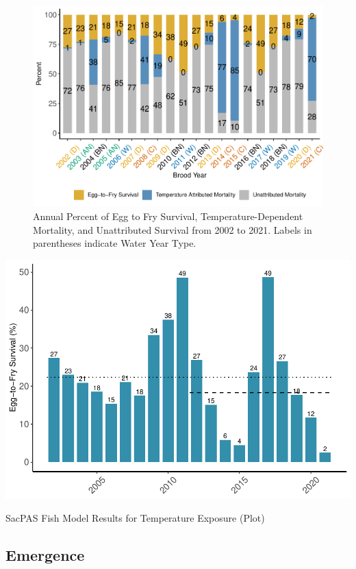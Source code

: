 \documentclass[
]{book}
\theoremstyle{definition}
\theoremstyle{definition}
\theoremstyle{definition}
\theoremstyle{definition}
\theoremstyle{remark}
\begin{document}
\begin{figure}
\centering
\includegraphics{_main_files/figure-latex/TDM-etf-fig-1.pdf}
\caption{\label{fig:TDM-etf-fig}Annual Percent of Egg to Fry Survival, Temperature-Dependent Mortality, and Unattributed Survival from 2002 to 2021. Labels in parentheses indicate Water Year Type.}
\end{figure}

\includegraphics{_main_files/figure-latex/ETFSurv-fig-1.pdf}

SacPAS Fish Model Results for Temperature Exposure (Plot)

\hypertarget{emergence}{%
\subsection{Emergence}\label{emergence}}
\end{document}
